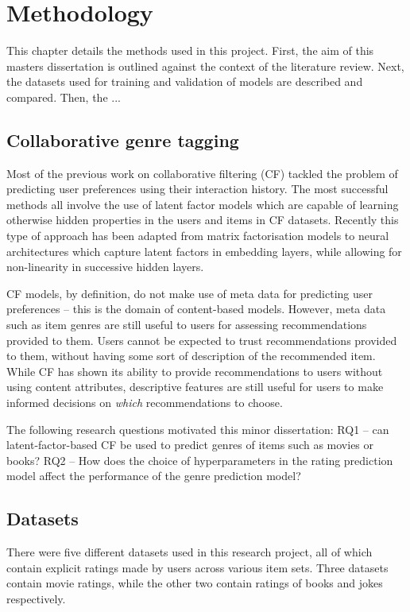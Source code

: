 \chapter{Methodology}
This chapter details the methods used in this project. First, the aim of this masters dissertation is outlined against the context of the literature review. Next, the datasets used for training and validation of models are described and compared. Then, the ...

\section{Collaborative genre tagging}
Most of the previous work on collaborative filtering (CF) tackled the problem of predicting user preferences using their interaction history. The most successful methods all involve the use of latent factor models which are capable of learning otherwise hidden properties in the users and items in CF datasets. Recently this type of approach has been adapted from matrix factorisation models to neural architectures which capture latent factors in embedding layers, while allowing for non-linearity in successive hidden layers. 

CF models, by definition, do not make use of meta data for predicting user preferences -- this is the domain of content-based models. However, meta data such as item genres are still useful to users for assessing recommendations provided to them. Users cannot be expected to trust recommendations provided to them, without having some sort of description of the recommended item. While CF has shown its ability to provide recommendations to users without using content attributes, descriptive features are still useful for users to make informed decisions on \textit{which} recommendations to choose.

The following research questions motivated this minor dissertation: RQ1 -- can latent-factor-based CF be used to predict genres of items such as movies or books? RQ2 -- How does the choice of hyperparameters in the rating prediction model affect the performance of the genre prediction model?

\section{Datasets}
There were five different datasets used in this research project, all of which contain explicit ratings made by users across various item sets. Three datasets contain movie ratings, while the other two contain ratings of books and jokes respectively.

